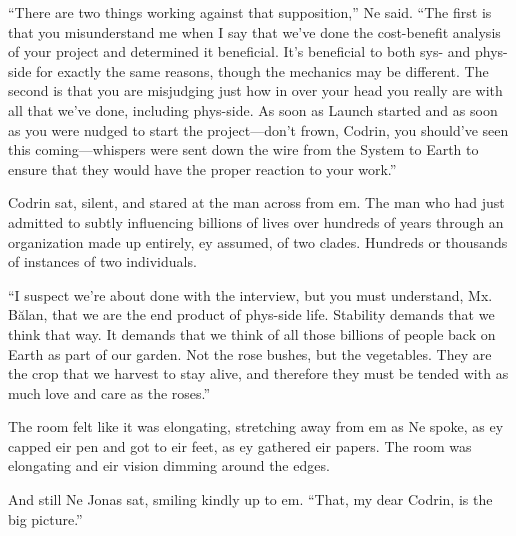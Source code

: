 ``There are two things working against that supposition,'' Ne said. ``The first is that you misunderstand me when I say that we've done the cost-benefit analysis of your project and determined it beneficial. It's beneficial to both sys- and phys-side for exactly the same reasons, though the mechanics may be different. The second is that you are misjudging just how in over your head you really are with all that we've done, including phys-side. As soon as Launch started and as soon as you were nudged to start the project---don't frown, Codrin, you should've seen this coming---whispers were sent down the wire from the System to Earth to ensure that they would have the proper reaction to your work.''

Codrin sat, silent, and stared at the man across from em. The man who had just admitted to subtly influencing billions of lives over hundreds of years through an organization made up entirely, ey assumed, of two clades. Hundreds or thousands of instances of two individuals.

``I suspect we're about done with the interview, but you must understand, Mx. Bălan, that we are the end product of phys-side life. Stability demands that we think that way. It demands that we think of all those billions of people back on Earth as part of our garden. Not the rose bushes, but the vegetables. They are the crop that we harvest to stay alive, and therefore they must be tended with as much love and care as the roses.''

The room felt like it was elongating, stretching away from em as Ne spoke, as ey capped eir pen and got to eir feet, as ey gathered eir papers. The room was elongating and eir vision dimming around the edges.

And still Ne Jonas sat, smiling kindly up to em. ``That, my dear Codrin, is the big picture.''
